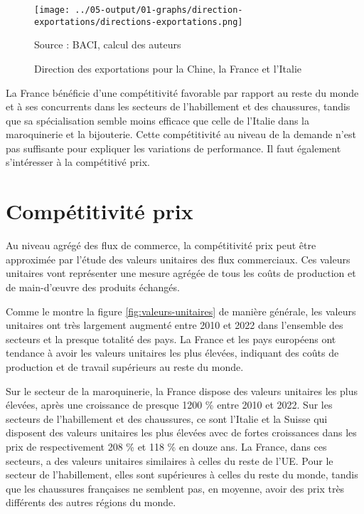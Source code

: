 \documentclass[french,10pt,a4paper]{article}
\begin{document}
\begin{figure}[!h]
  \centering
  \texttt{[image: ../05-output/01-graphs/direction-exportations/directions-exportations.png]}
  \captionsetup{justification=raggedright,singlelinecheck=false, font=small}
  \caption*{Source : BACI, calcul des auteurs}
  \captionsetup{justification=centering, singlelinecheck=true, font=normalsize}
  \caption{Direction des exportations pour la Chine, la France et l'Italie}
  \label{fig:direction-exportations}
\end{figure}


La France bénéficie d'une compétitivité favorable par rapport au reste du monde et à ses concurrents dans les secteurs de l'habillement et des chaussures, tandis que sa spécialisation semble moins efficace que celle de l'Italie dans la maroquinerie et la bijouterie. Cette compétitivité au niveau de la demande n'est pas suffisante pour expliquer les variations de performance. Il faut également s'intéresser à la compétitivé prix.

\section{Compétitivité prix}
Au niveau agrégé des flux de commerce, la compétitivité prix peut être approximée par l'étude des valeurs unitaires des flux commerciaux. Ces valeurs unitaires vont représenter une mesure agrégée de tous les coûts de production et de main-d'œuvre des produits échangés.

Comme le montre la figure \ref{fig:valeurs-unitaires} de manière générale, les valeurs unitaires ont très largement augmenté entre 2010 et 2022 dans l'ensemble des secteurs et la presque totalité des pays. La France et les pays européens ont tendance à avoir les valeurs unitaires les plus élevées, indiquant des coûts de production et de travail supérieurs au reste du monde.

Sur le secteur de la maroquinerie, la France dispose des valeurs unitaires les plus élevées, après une croissance de presque 1200 \% entre 2010 et 2022. Sur les secteurs de l'habillement et des chaussures, ce sont l'Italie et la Suisse qui disposent des valeurs unitaires les plus élevées avec de fortes croissances dans les prix de respectivement 208 \% et 118 \% en douze ans. La France, dans ces secteurs, a des valeurs unitaires similaires à celles du reste de l'UE. Pour le secteur de l'habillement, elles sont supérieures à celles du reste du monde, tandis que les chaussures françaises ne semblent pas, en moyenne, avoir des prix très différents des autres régions du monde. 
\end{document}
